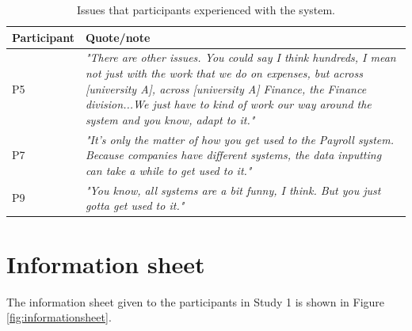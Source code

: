 \begin{table}[htp]
\centering
    \begin{tabular}{ | l | p{10cm} |}
    \hline
     \textbf{Participant} & \textbf{Quote/note} \\ \hline
    P5 &  \textit{"There are other issues. You could say I think hundreds, I mean not just with the work that we do on expenses, but across [university A], across [university A] Finance, the Finance division...We just have to kind of work our way around the system and you know, adapt to it."} \\ \hline
    P7 & \textit{"It's only the matter of how you get used to the Payroll system. Because companies have different systems, the data inputting can take a while to get used to it."} \\ \hline
    P9 &  \textit{"You know, all systems are a bit funny, I think. But you just gotta get used to it."} \\ \hline
    \end{tabular}
    \caption[Study 1 issues quotes]{Issues that participants experienced with the system.}
    \label{table:ch3_otherquotes}
\end{table}%


\chapter{Information sheet}\label{ch:information_sheet}
The information sheet given to the participants in Study 1 is shown in Figure \ref{fig:informationsheet}. 

